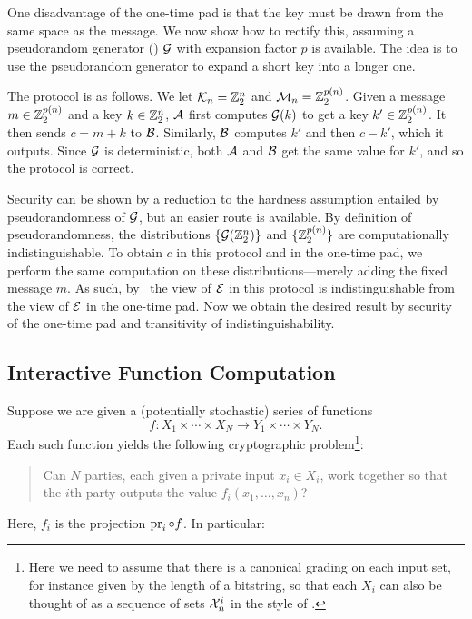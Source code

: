 \begin{ex}\label{ex:botp}
  One disadvantage of the one-time pad is that the key must be drawn from the
  same space as the message. We now show how to rectify this, assuming a
  pseudorandom generator
  ()
  $\mathcal{G}$ with expansion factor $p$ is available.
  The idea is to use the pseudorandom generator to expand a short
    key into a longer one.

  The protocol is as follows. We let $\mathcal{K}_n = \mathbb{Z}_2^n$ and $\mathcal{M}_n =
  \mathbb{Z}_2^{p(n)}$. Given a message $m\in\mathbb{Z}_2^{p(n)}$ and a key $k\in\mathbb{Z}_2^n$,
  $\mathcal{A}$ first computes $\mathcal{G}(k)$ to get a key $k'\in\mathbb{Z}_2^{p(n)}$. It then sends
  $c = m + k$ to $\mathcal{B}$. Similarly, $\mathcal{B}$ computes $k'$ and then $c - k'$, which
  it outputs. Since $\mathcal{G}$ is deterministic, both $\mathcal{A}$ and $\mathcal{B}$ get the same
  value for $k'$, and so the protocol is correct.

  Security can be shown by a reduction to the hardness assumption entailed by
  pseudorandomness of $\mathcal{G}$, but an easier route is available. By definition of
  pseudorandomness, the distributions $\{\mathcal{G}(\mathbb{Z}_2^n)\}$ and $\{\mathbb{Z}_2^{p(n)}\}$
  are computationally indistinguishable. To obtain $c$ in this protocol and in
  the one-time pad, we perform the same computation on these
  distributions---merely adding the fixed message $m$. As such,
  by~ the view of $\mathcal{E}$ in this
  protocol is indistinguishable from the view of $\mathcal{E}$ in the one-time pad. Now
  we obtain the desired result by security of the one-time pad and transitivity
  of indistinguishability.
\end{ex}

\subsection{Interactive Function Computation}


Suppose we are given a (potentially stochastic) series of functions \[
  f: X_1\times\cdots\times X_N\to Y_1\times\cdots\times Y_N.
\] Each such function yields the following cryptographic problem\footnote{
  Here we need to assume that there is a canonical grading on each input set, for
  instance given by the length of a bitstring, so that each $X_i$ can also be
  thought of as a sequence of sets $\mathcal{X}^i_n$ in the style of
  .
}:
\begin{quote}
  Can $N$ parties, each given a private input $x_i\in X_i$, work together so
  that the $i$th party outputs the value $f_i(x_1,\dots,x_n)$?
\end{quote}
Here, $f_i$ is the projection $\operatorname{pr}_i\circ f$. In particular:

